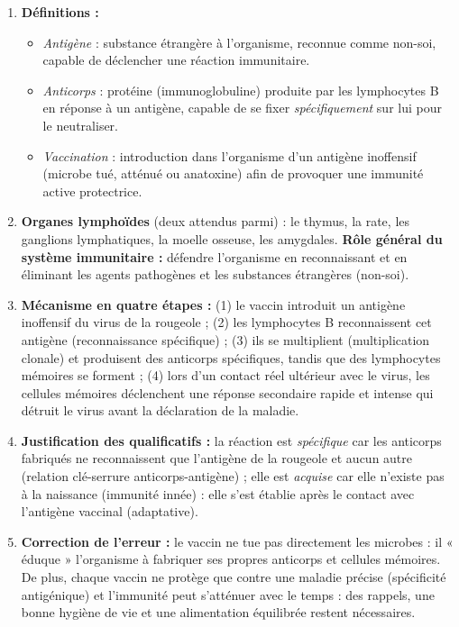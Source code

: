 \documentclass[11pt]{article}
\newcommand{\cle}[1]{{\popxbold\color{popdark}#1}}
\begin{document}
\begin{corrige}
\begin{enumerate}
\item \textbf{Définitions :}
\begin{itemize}
\item \emph{Antigène} : substance étrangère à l'organisme, reconnue comme \cle{non-soi}, capable de déclencher une réaction immunitaire.
\item \emph{Anticorps} : protéine (\cle{immunoglobuline}) produite par les \cle{lymphocytes B} en réponse à un antigène, capable de se fixer \emph{spécifiquement} sur lui pour le \cle{neutraliser}.
\item \emph{Vaccination} : introduction dans l'organisme d'un antigène inoffensif (microbe tué, atténué ou \cle{anatoxine}) afin de provoquer une \cle{immunité active} protectrice.
\end{itemize}
\item \textbf{Organes lymphoïdes} (deux attendus parmi) : le \cle{thymus}, la \cle{rate}, les \cle{ganglions lymphatiques}, la \cle{moelle osseuse}, les \cle{amygdales}. \textbf{Rôle général du système immunitaire :} défendre l'organisme en reconnaissant et en éliminant les agents pathogènes et les substances étrangères (\cle{non-soi}).
\item \textbf{Mécanisme en quatre étapes :} (1) le vaccin introduit un antigène inoffensif du virus de la rougeole ; (2) les lymphocytes B reconnaissent cet antigène (reconnaissance spécifique) ; (3) ils se multiplient (multiplication clonale) et produisent des anticorps spécifiques, tandis que des lymphocytes mémoires se forment ; (4) lors d'un contact réel ultérieur avec le virus, les cellules mémoires déclenchent une réponse secondaire rapide et intense qui détruit le virus avant la déclaration de la maladie.
\item \textbf{Justification des qualificatifs :} la réaction est \emph{spécifique} car les anticorps fabriqués ne reconnaissent que l'antigène de la rougeole et aucun autre (relation clé-serrure anticorps-antigène) ; elle est \emph{acquise} car elle n'existe pas à la naissance (immunité innée) : elle s'est établie après le contact avec l'antigène vaccinal (adaptative).
\item \textbf{Correction de l'erreur :} le vaccin ne tue pas directement les microbes : il « éduque » l'organisme à fabriquer ses propres anticorps et cellules mémoires. De plus, chaque vaccin ne protège que contre une maladie précise (spécificité antigénique) et l'immunité peut s'atténuer avec le temps : des rappels, une bonne hygiène de vie et une alimentation équilibrée restent nécessaires.

\end{enumerate}
\end{corrige}
\end{document}
